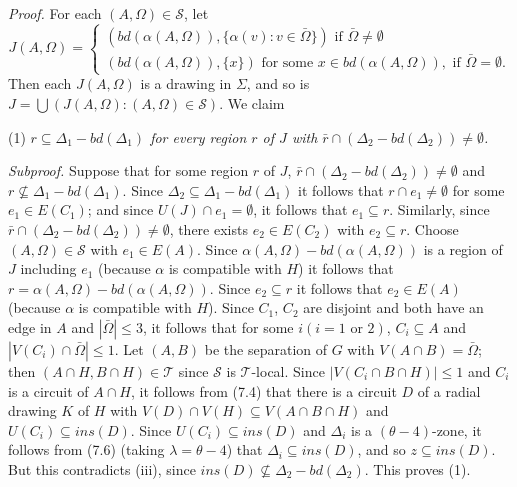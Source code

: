 \textit{Proof.} For each $(A, \Omega) \in \mathscr{S}$, let
\begin{equation*}
J(A, \Omega) = \begin{cases} (bd(\alpha(A, \Omega)), \{\alpha(v) : v \in \bar{\Omega}\}) \text{ if } \bar{\Omega} \ne \emptyset \\ (bd(\alpha(A, \Omega)), \{x\}) \text{ for some } x \in bd(\alpha(A, \Omega)), \text{ if } \bar{\Omega} = \emptyset. \end{cases}
\end{equation*}
Then each $J(A, \Omega)$ is a drawing in $\Sigma$, and so is $J = \bigcup (J(A, \Omega) : (A, \Omega) \in \mathscr{S})$. We claim

\hspace*{12pt}(1) \textit{$r \subseteq \Delta_1 - bd(\Delta_1)$ for every region $r$ of $J$ with $\bar{r} \cap (\Delta_2 - bd(\Delta_2)) \ne \emptyset$.}

\textit{Subproof.} Suppose that for some region $r$ of $J$, $\bar{r} \cap (\Delta_2 - bd(\Delta_2)) \ne \emptyset$ and $r \not\subseteq \Delta_1 - bd(\Delta_1)$. Since $\Delta_2 \subseteq \Delta_1 - bd(\Delta_1)$ it follows that $r \cap e_1 \ne \emptyset$ for some $e_1 \in E(C_1)$; and since $U(J) \cap e_1 = \emptyset$, it follows that $e_1 \subseteq r$. Similarly, since $\bar{r} \cap (\Delta_2 - bd(\Delta_2)) \ne \emptyset$, there exists $e_2 \in E(C_2)$ with $e_2 \subseteq r$. Choose $(A, \Omega) \in \mathscr{S}$ with $e_1 \in E(A)$. Since $\alpha(A, \Omega) - bd(\alpha(A, \Omega))$ is a region of $J$ including $e_1$ (because $\alpha$ is compatible with $H$) it follows that $r = \alpha(A, \Omega) - bd(\alpha(A, \Omega))$. Since $e_2 \subseteq r$ it follows that $e_2 \in E(A)$ (because $\alpha$ is compatible with $H$). Since $C_1$, $C_2$ are disjoint and both have an edge in $A$ and $|\bar{\Omega}| \le 3$, it follows that for some $i(i = 1 \text{ or } 2)$, $C_i \subseteq A$ and $|V(C_i) \cap \bar{\Omega}| \le 1$. Let $(A, B)$ be the separation of $G$ with $V(A \cap B) = \bar{\Omega}$; then $(A \cap H, B \cap H) \in \mathscr{T}$ since $\mathscr{S}$ is $\mathscr{T}$-local. Since $|V(C_i \cap B \cap H)| \le 1$ and $C_i$ is a circuit of $A \cap H$, it follows from (7.4) that there is a circuit $D$ of a radial drawing $K$ of $H$ with $V(D) \cap V(H) \subseteq V(A \cap B \cap H)$ and $U(C_i) \subseteq ins(D)$. Since $U(C_i) \subseteq ins(D)$ and $\Delta_i$ is a $(\theta - 4)$-zone, it follows from (7.6) (taking $\lambda = \theta - 4$) that $\Delta_i \subseteq ins(D)$, and so $z \subseteq ins(D)$. But this contradicts (iii), since $ins(D) \not\subseteq \Delta_2 - bd(\Delta_2)$. This proves (1).

